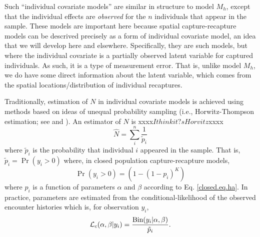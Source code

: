 Such ``individual covariate models'' are similar in structure to model
$M_{h}$, except that the individual effects are {\it observed} for the
$n$ individuals that appear in the sample. These models are important
here because spatial capture-recapture models can be descrived precisely as a form of
individual covariate model, an idea that we will develop here and
elsewhere. Specifically, they are such models, but where the
individual covariate is a partially observed latent variable for 
captured individuals. As such, it is a type of measurement error.
That is, unlike model $M_h$, we do have some direct information about the
latent variable, which comes from the spatial locations/distribution
of individual recaptures.

Traditionally, estimation of $N$ in individual covariate models is
achieved using methods based on ideas of unequal probability sampling
(i.e., Horwitz-Thompson estimation; see \citet{huggins:1989} and
\citet{alho:1990}). An estimator of $N$ is xxxx$I think it?s Horvitz$xxxx
\[
\hat{N} = \sum_{i}^{n} \frac{1}{\tilde{p}_{i}}
\]
where $\tilde{p}_{i}$ is the probability that individual $i$ appeared
in the sample.  That is, $\tilde{p}_{i} = \Pr(y_{i}>0)$
where, in closed population capture-recapture models, 
\[
\Pr(y_{i}>0) = (1- (1-p_{i})^K)
\]
where $p_{i}$ is a function of parameters $\alpha$ and $\beta$
according to Eq. \ref{closed.eq.ha}.  In practice, parameters are
estimated from the conditional-likelihood of the observed encounter
histories which is, for observation $y_{i}$,
\[
{\cal L}_{c}(\alpha, \beta | y_{i}) = \frac{ \mbox{Bin}(y_{i}|\alpha,\beta) } { \tilde{p}_{i}}.
\]

